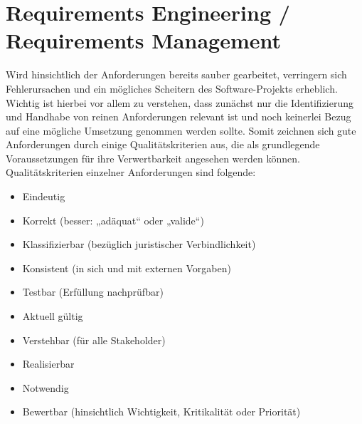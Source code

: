 
\section{Requirements Engineering / Requirements Management}
Wird hinsichtlich der Anforderungen bereits sauber gearbeitet, verringern sich Fehlerursachen und ein mögliches Scheitern des Software-Projekts erheblich. Wichtig ist hierbei vor allem zu verstehen, dass zunächst nur die Identifizierung und Handhabe von reinen Anforderungen relevant ist und noch keinerlei Bezug auf eine mögliche Umsetzung genommen werden sollte. Somit zeichnen sich gute Anforderungen durch einige Qualitätskriterien aus, die als grundlegende Voraussetzungen für ihre Verwertbarkeit angesehen werden können. 
\\
Qualitätskriterien einzelner Anforderungen sind folgende:
\\
\begin{itemize}
	\item Eindeutig
	\item Korrekt (besser: „adäquat“ oder „valide“)
	\item Klassifizierbar (bezüglich juristischer Verbindlichkeit)
	\item Konsistent (in sich und mit externen Vorgaben)
	\item Testbar (Erfüllung nachprüfbar)
	\item Aktuell gültig
	\item Verstehbar (für alle Stakeholder)
	\item Realisierbar
	\item Notwendig
	\item Bewertbar (hinsichtlich Wichtigkeit, Kritikalität oder Priorität)
\end{itemize}

